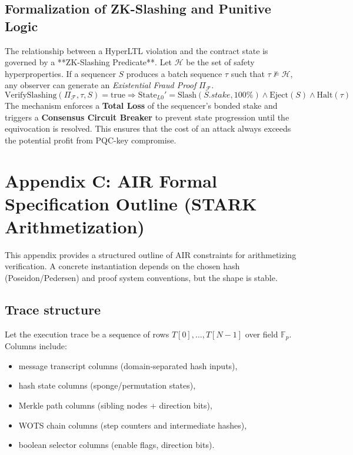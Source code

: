 \documentclass[conference]{IEEEtran}
\theoremstyle{definition}
\theoremstyle{plain}
\theoremstyle{remark}
\newcommand{\F}{\mathbb{F}}
\begin{document}
\subsection*{Formalization of ZK-Slashing and Punitive Logic}
The relationship between a HyperLTL violation and the contract state is governed by a **ZK-Slashing Predicate**. Let $\mathcal{H}$ be the set of safety hyperproperties. If a sequencer $S$ produces a batch sequence $\tau$ such that $\tau \not\models \mathcal{H}$, any observer can generate an \textit{Existential Fraud Proof} $\Pi_{\mathcal{F}}$.
\begin{equation}
\text{VerifySlashing}(\Pi_{\mathcal{F}}, \tau, S) = \text{true} \Rightarrow \text{State}_{L0}' = \text{Slash}(S.stake, 100\%) \wedge \text{Eject}(S) \wedge \text{Halt}(\tau)
\end{equation}
The mechanism enforces a \textbf{Total Loss} of the sequencer's bonded stake and triggers a \textbf{Consensus Circuit Breaker} to prevent state progression until the equivocation is resolved. This ensures that the cost of an attack always exceeds the potential profit from PQC-key compromise.

\section{Appendix C: AIR Formal Specification Outline (STARK Arithmetization)}
\label{app:air}
This appendix provides a structured outline of AIR constraints for arithmetizing verification. A concrete instantiation depends on the chosen hash (Poseidon/Pedersen) and proof system conventions, but the shape is stable.

\subsection*{Trace structure}
Let the execution trace be a sequence of rows $T[0],\dots,T[N-1]$ over field $\F_p$. Columns include:
\begin{itemize}
\item message transcript columns (domain-separated hash inputs),
\item hash state columns (sponge/permutation states),
\item Merkle path columns (sibling nodes + direction bits),
\item WOTS chain columns (step counters and intermediate hashes),
\item boolean selector columns (enable flags, direction bits).
\end{itemize}
\end{document}

